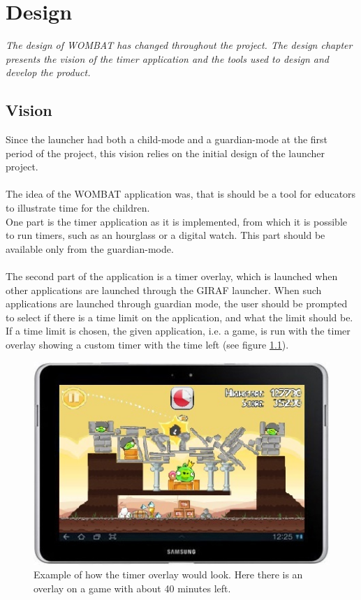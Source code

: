 \chapter{Design}
\label{cha:design}
\textit{The design of WOMBAT has changed throughout the project. The design chapter presents the vision of the timer application and the tools used to design and develop the product.} %

\section{Vision}
\label{sec:vision}
Since the launcher had both a child-mode and a guardian-mode at the first period of the project, this vision relies on the initial design of the launcher project.\\ \\
	The idea of the WOMBAT application was, that is should be a tool for educators to illustrate time for the children.\\
	
One part is the timer application as it is implemented, from which it is possible to run timers, such as an hourglass or a digital watch. This part should be available only from the guardian-mode.\\ \\
  The second part of the application is a timer overlay, which is launched when other applications are launched through the GIRAF launcher. When such applications are launched through guardian mode, the user should be prompted to select if there is a time limit on the application, and what the limit should be. If a time limit is chosen, the given application, i.e. a game, is run with the timer overlay showing a custom timer with the time left (see figure \ref{fig:init_overlay_drawings}).
	
	\begin{figure}[H]
		\centering
			\includegraphics[width=\textwidth]{Images/paper_prototype/overlay.png}
				\caption{Example of how the timer overlay would look. Here there is an overlay on a game with about 40 minutes left.}
		\label{fig:init_overlay_drawings}
	\end{figure}
	
